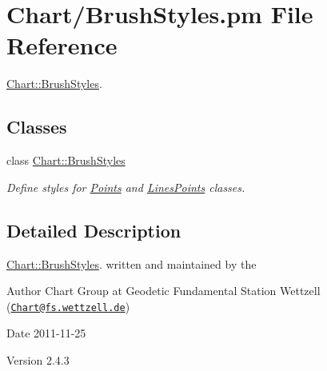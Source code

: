 \hypertarget{BrushStyles_8pm}{
\section{Chart/BrushStyles.pm File Reference}
\label{BrushStyles_8pm}
}


\hyperlink{classChart_1_1BrushStyles}{Chart::BrushStyles}.  


\subsection*{Classes}
\begin{DoxyCompactItemize}
\item 
class \hyperlink{classChart_1_1BrushStyles}{Chart::BrushStyles}
\begin{DoxyCompactList}\small\item\em Define styles for \hyperlink{classChart_1_1Points}{Points} and \hyperlink{classChart_1_1LinesPoints}{LinesPoints} classes. \item\end{DoxyCompactList}\end{DoxyCompactItemize}


\subsection{Detailed Description}
\hyperlink{classChart_1_1BrushStyles}{Chart::BrushStyles}. written and maintained by the \begin{DoxyAuthor}{Author}
Chart Group at Geodetic Fundamental Station Wettzell (\href{mailto:Chart@fs.wettzell.de}{\tt Chart@fs.wettzell.de}) 
\end{DoxyAuthor}
\begin{DoxyDate}{Date}
2011-\/11-\/25 
\end{DoxyDate}
\begin{DoxyVersion}{Version}
2.4.3 
\end{DoxyVersion}
